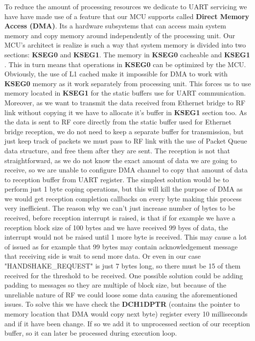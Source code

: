 To reduce the amount of processing resources we dedicate to UART servicing we have have made use of a feature that our MCU supports called \textbf{Direct Memory Access (DMA)}. Its a hardware subsystems that can access main system memory and copy memory around independently of the processing unit. Our MCU's architect is realize is such a way that system memory is divided into two sections: \textbf{KSEG0} and \textbf{KSEG1}. The memory in \textbf{KSEG0} cacheable and \textbf{KSEG1} \cite{pic-datasheet}. This in turn means that operations in \textbf{KSEG0} can be optimized by the MCU. Obviously, the use of L1 cached make it impossible for DMA to work with \textbf{KSEG0} memory as it work separately from processing unit. This forces us to use memory located in \textbf{KSEG1} for the static buffers use for UART communication. Moreover, as we want to transmit the data received from Ethernet bridge to RF link without copying it we have to allocate it's buffer in \textbf{KSEG1} section too. As the data is sent to RF core directly from the static buffer used for Ethernet bridge reception, we do not need to keep a separate buffer for transmission, but just keep track of packets we must pass to RF link with the use of Packet Queue data structure, and free them after they are sent. The reception is not that straightforward, as we do not know the exact amount of data we are going to receive, so we are unable to configure DMA channel to copy that amount of data to reception buffer from UART register. The simplest solution would be to perform just 1 byte coping operations, but this will kill the purpose of DMA as we would get reception completion callbacks on every byte making this process very inefficient. The reason why we can't just increase number of bytes to be received, before reception interrupt is raised, is that if for example we have a reception block size of 100 bytes and we have received 99 byes of data, the interrupt would not be raised until 1 more byte is received. This may cause a lot of issued as for example that 99 bytes may contain acknowledgement message that receiving side is wait to send more data. Or even in our case "HANDSHAKE\_REQUEST" is just 7 bytes long, so there must be 15 of them received for the threshold to be received. One possible solution could be adding padding to messages so they are multiple of block size, but because of the unreliable nature of RF we could loose some data causing the aforementioned issues. To solve this we have check the \textbf{DCH1DPTR} (contains the pointer to memory location that DMA would copy next byte) register every 10 milliseconds and if it have been change. If so we add it to unprocessed section of our reception buffer, so it can later be processed during execution loop. 

